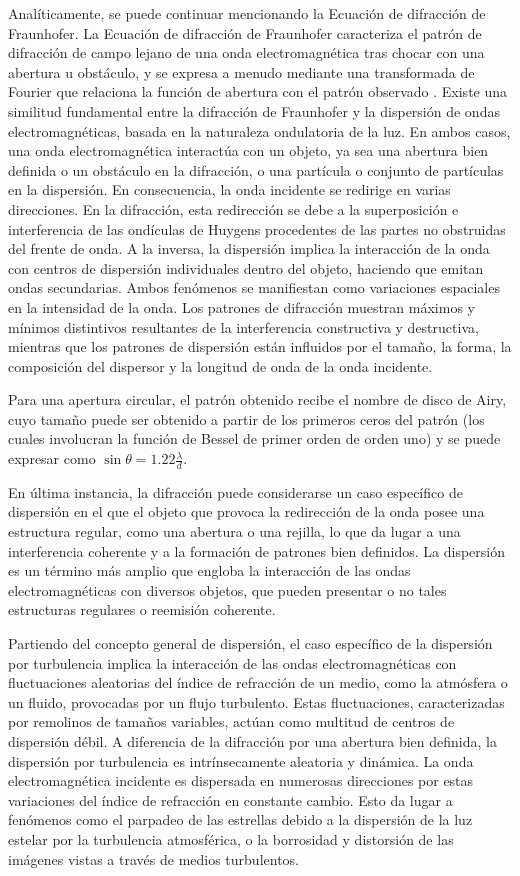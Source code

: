 Analíticamente, se puede continuar mencionando la Ecuación de difracción de Fraunhofer. La Ecuación de difracción de Fraunhofer caracteriza el patrón de difracción de campo lejano de una onda electromagnética tras chocar con una abertura u obstáculo, y se expresa a menudo mediante una transformada de Fourier que relaciona la función de abertura con el patrón observado \cite{lipson_optical_2010}. Existe una similitud fundamental entre la difracción de Fraunhofer y la dispersión de ondas electromagnéticas, basada en la naturaleza ondulatoria de la luz. En ambos casos, una onda electromagnética interactúa con un objeto, ya sea una abertura bien definida o un obstáculo en la difracción, o una partícula o conjunto de partículas en la dispersión. En consecuencia, la onda incidente se redirige en varias direcciones. En la difracción, esta redirección se debe a la superposición e interferencia de las ondículas de Huygens procedentes de las partes no obstruidas del frente de onda. A la inversa, la dispersión implica la interacción de la onda con centros de dispersión individuales dentro del objeto, haciendo que emitan ondas secundarias. Ambos fenómenos se manifiestan como variaciones espaciales en la intensidad de la onda. Los patrones de difracción muestran máximos y mínimos distintivos resultantes de la interferencia constructiva y destructiva, mientras que los patrones de dispersión están influidos por el tamaño, la forma, la composición del dispersor y la longitud de onda de la onda incidente.

Para una apertura circular, el patrón obtenido recibe el nombre de disco de Airy, cuyo tamaño puede ser obtenido a partir de los primeros ceros del patrón (los cuales involucran la función de Bessel de primer orden de orden uno) y se puede expresar como $\sin \theta = 1.22 \frac{\lambda}{d}$.

En última instancia, la difracción puede considerarse un caso específico de dispersión en el que el objeto que provoca la redirección de la onda posee una estructura regular, como una abertura o una rejilla, lo que da lugar a una interferencia coherente y a la formación de patrones bien definidos. La dispersión es un término más amplio que engloba la interacción de las ondas electromagnéticas con diversos objetos, que pueden presentar o no tales estructuras regulares o reemisión coherente.

Partiendo del concepto general de dispersión, el caso específico de la dispersión por turbulencia implica la interacción de las ondas electromagnéticas con fluctuaciones aleatorias del índice de refracción de un medio, como la atmósfera o un fluido, provocadas por un flujo turbulento. Estas fluctuaciones, caracterizadas por remolinos de tamaños variables, actúan como multitud de centros de dispersión débil. A diferencia de la difracción por una abertura bien definida, la dispersión por turbulencia es intrínsecamente aleatoria y dinámica. La onda electromagnética incidente es dispersada en numerosas direcciones por estas variaciones del índice de refracción en constante cambio. Esto da lugar a fenómenos como el parpadeo de las estrellas debido a la dispersión de la luz estelar por la turbulencia atmosférica, o la borrosidad y distorsión de las imágenes vistas a través de medios turbulentos. 

